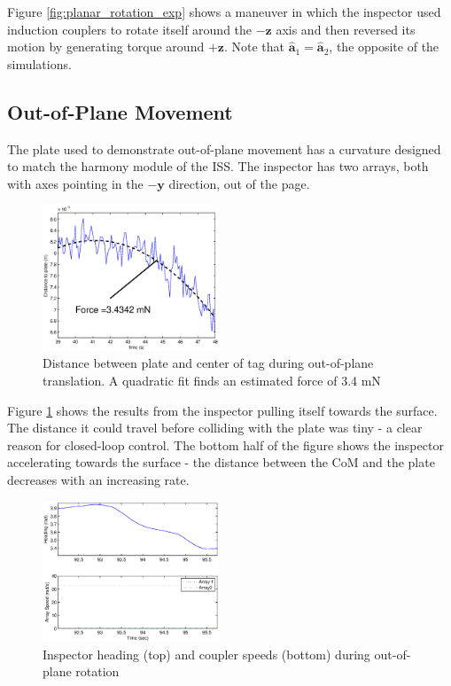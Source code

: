 \documentclass[letterpaper, 10 pt, conference]{ieeeconf}  %
\begin{document}
  \par Figure \ref{fig:planar_rotation_exp} shows a maneuver in which the inspector used induction couplers to rotate itself around the $-\textbf{z}$ axis and then reversed its motion by generating torque around $+\textbf{z}$.  Note that $\hat{\textbf{a}}_1 =  \hat{\textbf{a}}_2$, the opposite of the simulations.

     \subsection{Out-of-Plane Movement}\label{sec:oop_movement_exp}
     
     The plate used to demonstrate out-of-plane movement has a curvature designed to match the harmony module of the ISS. The inspector has two arrays, both with axes pointing in the $-\textbf{y}$ direction, out of the page.  
         \begin{figure}[thpb]
      \centering
      \includegraphics[width = 0.47\textwidth]{figures/oop_translation_exp.eps}
      \caption{Distance between plate and center of tag during out-of-plane translation. A quadratic fit finds an estimated force of 3.4 mN}
      \label{fig:oop_translation_exp}
   \end{figure}
   
   \par Figure \ref{fig:oop_translation_exp} shows the results from the inspector pulling itself towards the surface. The distance it could travel before colliding with the plate was tiny - a clear reason for closed-loop control. The bottom half of the figure shows the inspector accelerating towards the surface - the distance between the CoM and the plate decreases with an increasing rate. 
  
      
         \begin{figure}[thpb]
      \centering
      \includegraphics[width = 0.47\textwidth]{figures/oop_rotation.eps}
      \caption{Inspector heading (top) and coupler speeds (bottom) during out-of-plane rotation}
      \label{fig:oop_rotation_exp}
   \end{figure}
   
\end{document}
